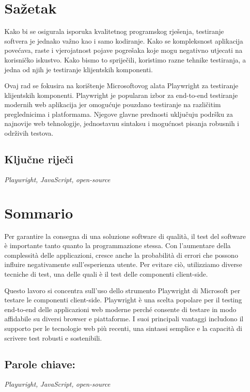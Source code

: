 \section*{Sažetak}\label{sazetak_hr}
Kako bi se osigurala isporuka kvalitetnog programskog rješenja, testiranje softvera je jednako važno kao i samo kodiranje.
Kako se kompleksnost aplikacija povećava, raste i vjerojatnost pojave pogrešaka koje mogu negativno utjecati na korisničko iskustvo.
Kako bismo to spriječili, koristimo razne tehnike testiranja, a jedna od njih je testiranje klijentskih komponenti.

Ovaj rad se fokusira na korištenje Microsoftovog alata Playwright za testiranje klijentskih komponenti.
Playwright je popularan izbor za end-to-end testiranje modernih web aplikacija jer omogućuje pouzdano testiranje na različitim preglednicima i platformama.
Njegove glavne prednosti uključuju podršku za najnovije web tehnologije, jednostavnu sintaksu i mogućnost pisanja robusnih i održivih testova.
\subsection*{Ključne riječi}\label{kw_hr}
\textit{Playwright, JavaScript, open-source}

\section*{Sommario}\label{sazetak_it}
Per garantire la consegna di una soluzione software di qualità, il test del software è importante tanto quanto la programmazione stessa.
Con l'aumentare della complessità delle applicazioni, cresce anche la probabilità di errori che possono influire negativamente sull'esperienza utente.
Per evitare ciò, utilizziamo diverse tecniche di test, una delle quali è il test delle componenti client-side.

Questo lavoro si concentra sull'uso dello strumento Playwright di Microsoft per testare le componenti client-side.
Playwright è una scelta popolare per il testing end-to-end delle applicazioni web moderne perché consente di testare in modo affidabile su diversi browser e piattaforme.
I suoi principali vantaggi includono il supporto per le tecnologie web più recenti, una sintassi semplice e la capacità di scrivere test robusti e sostenibili.

\subsection*{Parole chiave:}\label{kw_it}
\textit{Playwright, JavaScript, open-source}

